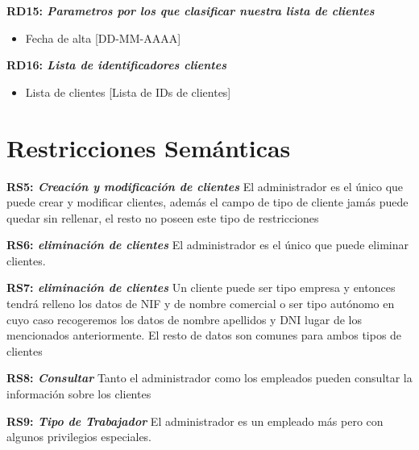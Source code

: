 \documentclass[paper=a4, fontsize=11pt, spanish]{scrartcl}
\begin{document}
\setlength{\parindent}{0em}
\textbf{RD15: \textit{Parametros por los que clasificar nuestra lista de clientes}}
\setlength{\parindent}{2em}
\begin{itemize}
	\item Fecha de alta [DD-MM-AAAA]
\end{itemize}

\setlength{\parindent}{0em}
\textbf{RD16: \textit{Lista de identificadores clientes}}
\setlength{\parindent}{2em}
\begin{itemize}
	\item Lista de clientes [Lista de IDs de clientes]
\end{itemize}

\section{Restricciones Semánticas}
\setlength{\parindent}{0em}
\textbf{RS5: \textit{Creación y modificación de clientes}}
\setlength{\parindent}{2em}
El administrador es el único que puede crear y modificar clientes, además el campo de tipo de cliente jamás puede quedar sin rellenar, el resto no poseen este tipo de restricciones 

\setlength{\parindent}{0em}
\textbf{RS6: \textit{eliminación de clientes}}
\setlength{\parindent}{2em}
El administrador es el único que puede eliminar clientes.

\setlength{\parindent}{0em}
\textbf{RS7: \textit{eliminación de clientes}}
\setlength{\parindent}{2em}
Un cliente puede ser tipo empresa y entonces tendrá relleno los datos de NIF y de nombre comercial o ser tipo autónomo en cuyo caso recogeremos los datos de nombre apellidos y DNI lugar de los mencionados anteriormente. El resto de datos son comunes para ambos tipos de clientes


\setlength{\parindent}{0em}
\textbf{RS8: \textit{Consultar}}
\setlength{\parindent}{2em}
Tanto el administrador como los empleados pueden consultar la información sobre los clientes


\setlength{\parindent}{0em}
\textbf{RS9: \textit{Tipo de Trabajador}}
\setlength{\parindent}{2em}
El administrador es un empleado más pero con algunos privilegios especiales.
\end{document}
